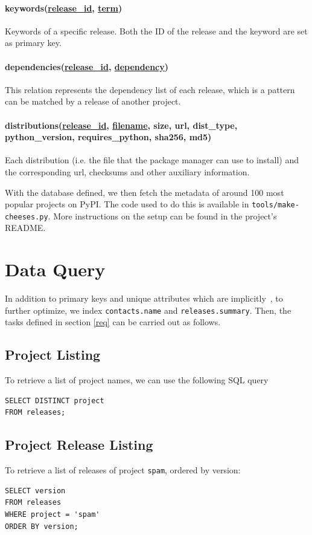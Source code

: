 \documentclass[a4paper,12pt]{article}
\newcommand{\id}[1]{\underline{#1\_id}}
\begin{document}
\paragraph{keywords(\id{release}, \underline{term})} Keywords of a specific
release.  Both the ID of the release and the keyword are set as primary key.

\paragraph{dependencies(\id{release}, \underline{dependency})} This relation
represents the dependency list of each release, which is a pattern can be
matched by a release of another project.

\paragraph{distributions(\id{release}, \underline{filename}, size, url,
dist\_type, python\_version, requires\_python, sha256, md5)}
Each distribution (i.e. the file that the package manager can use to install)
and the corresponding url, checksums and other auxiliary information.

With the database defined, we then fetch the metadata of around 100 most
popular projects on PyPI.  The code used to do this is available in
\verb|tools/make-cheeses.py|.  More instructions on the setup can be found
in the project's README.

\section{Data Query}
In addition to primary keys and unique attributes which are
implicitly~\cite{idx}, to further optimize, we index \verb|contacts.name|
and \verb|releases.summary|.  Then, the tasks defined in section \ref{req}
can be carried out as follows.

\subsection{Project Listing}
To retrieve a list of project names, we can use the following SQL query
\begin{verbatim}
SELECT DISTINCT project
FROM releases;
\end{verbatim}

\subsection{Project Release Listing}
To retrieve a list of releases of project \verb|spam|, ordered by version:
\begin{verbatim}
SELECT version
FROM releases
WHERE project = 'spam'
ORDER BY version;
\end{verbatim}
\end{document}
